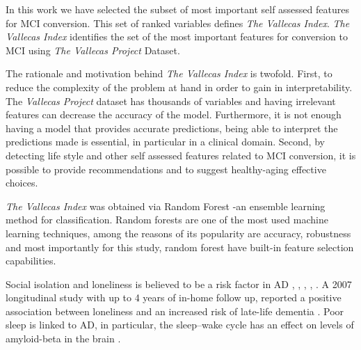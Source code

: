 \documentclass[preprint,12pt]{elsarticle}
\begin{document}
In this work we have selected the subset of most important self assessed features for MCI conversion. This set of ranked variables defines \emph{The Vallecas Index}. 
\emph{The Vallecas Index} identifies the set of the most important features for conversion to MCI using \emph{The Vallecas Project} Dataset. 

The rationale and motivation behind \emph{The Vallecas Index} is twofold. First, to reduce the complexity of the problem at hand in order to gain in interpretability. The \emph{Vallecas Project} dataset has thousands of variables and having irrelevant features can decrease the accuracy of the model. Furthermore, it is not enough having a model that provides accurate predictions, being able to interpret the predictions made is essential, in particular in a clinical domain.
Second, by detecting life style and other self assessed features related to MCI conversion, it is possible to provide recommendations and to suggest healthy-aging effective choices.


\emph{The Vallecas Index} was obtained via Random Forest -an ensemble learning method for classification. Random forests are one of the most used machine learning techniques, among the reasons of its popularity are accuracy, robustness and most importantly for this study, random forest have built-in feature selection capabilities. 

Social isolation and loneliness is believed to be a risk factor in AD \cite{holmen1992loneliness}, \cite{fratiglioni2000influence}, \cite{shankar2013social}, \cite{holwerda2014feelings}, \cite{evans2018social}. A 2007 longitudinal study with up to 4 years of in-home follow up, reported a positive association between loneliness and an increased risk of late-life dementia \cite{wilson2007loneliness}. Poor sleep is linked to AD, in particular, the sleep–wake cycle has an effect on levels of amyloid-beta in the brain \cite{ju2014sleep}.
\end{document}

